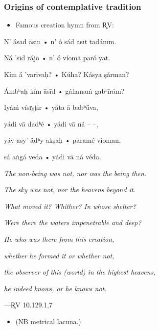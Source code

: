 \documentclass[pdf]{beamer}
\begin{document}
\begin{frame} \frametitle{Origins of contemplative tradition}
\begin{itemize}
	\item Famous creation hymn from R̥V:
\end{itemize}

\begin{center}
\begin{multicols}{2}
\scriptsize{
	N' ā́sad āsīn • n' ó sád āsīt tadā́nīm.

	Nā́ 'sīd rájo • n' ó víomā paró yat.

	Kím ā́ 'varīvaḥ? • Kúha? Kásya şárman?

	Ámbʰaḥ kím āsīd • gáhanaṁ gabʰīrám?

	\vspace{\baselineskip}

	Iyáṁ vísr̥ṣṭir • yáta ā babʰū́va,

	yádi vā dadʰé • yádi vā ná -- --,

	yáv asy' ā́dʰy-akṣaḥ • paramé víoman,

	sá aṅgá veda • yádi vā ná véda.

	\columnbreak

	\textit{The non-being was not, nor was the being then.}

	\textit{The sky was not, nor the heavens beyond it.}

	\textit{What moved it? Whither? In whose shelter?}

	\textit{Were there the waters impenetrable and deep?}

	\vspace{\baselineskip}

	\textit{He who was there from this creation,}

	\textit{whether he formed it or whether not,}

	\textit{the observer of this (world) in the highest heavens,}

	\textit{he indeed knows, or he knows not.}
}
\end{multicols}
 ---R̥V 10.129.1,7
\end{center}

\begin{itemize}
	\item (NB metrical lacuna.)
\end{itemize}
\end{frame}
\end{document}
